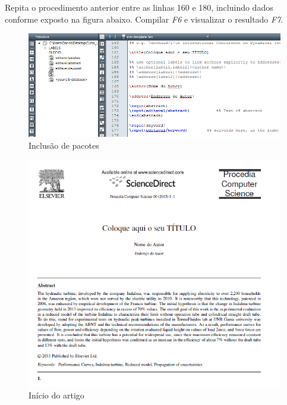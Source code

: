 \begin{frame}[fragile]
Repita o procedimento anterior entre as linhas 160 e 180, incluindo dados conforme exposto na figura abaixo.
Compilar \textit{F6}  e visualizar o resultado \textit{F7}.
\begin{figure}
\begin{center}
\includegraphics[scale=.5]{figuras/fig3}
\caption{Inclusão de pacotes}
\end{center}
\end{figure}
\end{frame}


\begin{frame}[fragile]
\begin{figure}
\begin{center}
\includegraphics[scale=.4]{figuras/fig4}
\caption{Início do artigo}
\end{center}
\end{figure}
\end{frame}



